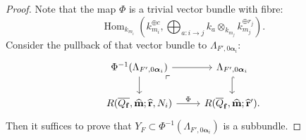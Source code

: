 \documentclass[a4paper,12pt]{article}
\theoremstyle{definition}
\theoremstyle{plain}
\theoremstyle{remark}
\DeclareMathOperator{\Hom}{Hom}
\newcommand\bfalpha{\bm{\alpha}}
\newcommand\bff{\mathbf{f}}
\newcommand\bfm{\mathbf{m}}
\newcommand\bfr{\mathbf{r}}
\begin{document}
\begin{proof}
Note that the map $\Phi$ is a trivial vector bundle with fibre:
\[
\Hom_{k_{m_i}}\left( k_{m_i}^{\oplus c},\bigoplus_{a:i\rightarrow j}k_a\otimes_{k_{m_j}}k_{m_j}^{\oplus r_j}\right)
.
\]
Consider the pullback of that vector bundle to $\Lambda_{F',0\bfalpha_i}$:
\[
\begin{tikzcd}
\Phi^{-1}(\Lambda_{F',0\bfalpha_i}) \ar[r]\ar[d]\arrow[dr, phantom, "\ulcorner", very near start] & \Lambda_{F',0\bfalpha_i} \ar[d,hookrightarrow] \\
R(\overline{Q_\bff},\widehat{\bfm};\widehat{\bfr},N_i) \ar[r,"\Phi"] & R(\overline{Q}_\bff,\widehat{\bfm};\widehat{\bfr}') .
\end{tikzcd}
\]
Then it suffices to prove that $Y_F\subset\Phi^{-1}(\Lambda_{F',0\bfalpha_i})$ is a subbundle.


\end{proof}
\end{document}
